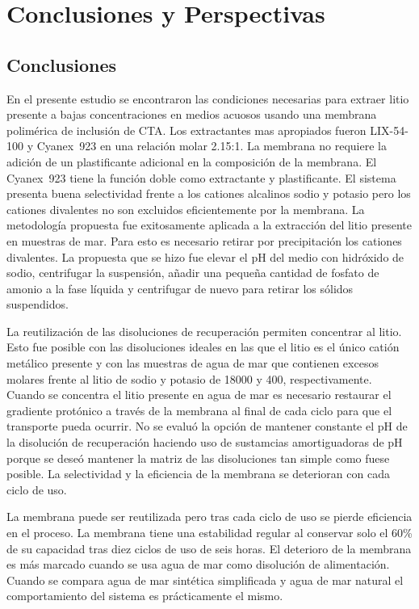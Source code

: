 \chapter{Conclusiones y Perspectivas}
\section{Conclusiones}
En el presente estudio se encontraron las condiciones necesarias para extraer litio presente a bajas concentraciones en medios acuosos usando una membrana polimérica de inclusión de CTA. Los extractantes mas apropiados fueron LIX-54-100 y Cyanex~923 en una relación molar 2.15:1. La membrana no requiere la adición de un plastificante adicional en la composición de la membrana. El Cyanex~923 tiene la función doble como extractante y plastificante. El sistema presenta buena selectividad frente a los cationes alcalinos sodio y potasio pero los cationes divalentes no son excluidos eficientemente por la membrana. La metodología propuesta fue exitosamente aplicada a la extracción del litio presente en muestras de mar. Para esto es necesario retirar por precipitación los cationes divalentes. La propuesta que se hizo fue elevar el pH del medio con hidróxido de sodio, centrifugar la suspensión, añadir una pequeña cantidad de fosfato de amonio a la fase líquida y centrifugar de nuevo para retirar los sólidos suspendidos. 

La reutilización de las disoluciones de recuperación permiten concentrar al litio. Esto fue posible con las disoluciones ideales en las que el litio es el único catión metálico presente y con las muestras de agua de mar que contienen excesos molares frente al litio de sodio y potasio de 18000 y 400, respectivamente. Cuando se concentra el litio presente en agua de mar es necesario restaurar el gradiente protónico a través de la membrana al final de cada ciclo para que el transporte pueda ocurrir. No se evaluó la opción de mantener constante el pH de la disolución de recuperación haciendo uso de sustamcias amortiguadoras de pH porque se deseó mantener la matriz de las disoluciones tan simple como fuese posible. La selectividad y la eficiencia de la membrana se deterioran con cada ciclo de uso.

La membrana puede ser reutilizada pero tras cada ciclo de uso se pierde eficiencia en el proceso. La membrana tiene una estabilidad regular al conservar solo el 60\% de su capacidad tras diez ciclos de uso de seis horas. El deterioro de la membrana es más marcado cuando se usa agua de mar como disolución de alimentación. Cuando se compara agua de mar sintética simplificada y agua de mar natural el comportamiento del sistema es prácticamente el mismo. 

